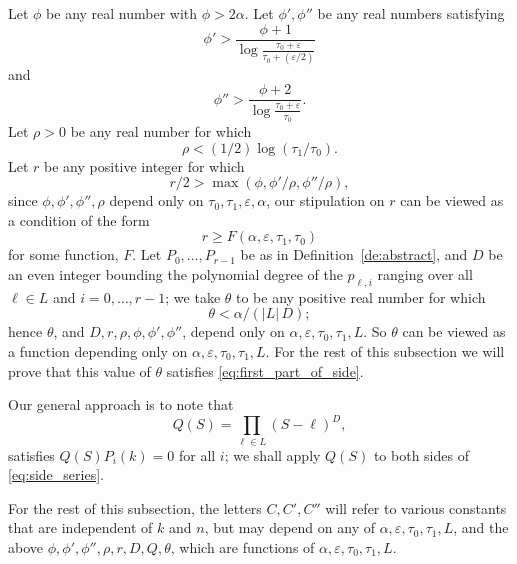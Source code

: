 \documentclass{memo-l}
\theoremstyle{plain}
\theoremstyle{definition}
\numberwithin{section}{chapter}
\numberwithin{equation}{chapter}
\theoremstyle{plain}
\theoremstyle{definition}
\begin{document}
Let \( \phi \) be any real number with \( \phi>2\alpha \).  Let \(
\phi',\phi'' \) be any real numbers satisfying
\begin{equation}\label{eq:givephi1} \phi' >
\frac{\phi+1}{\log\frac{\tau_0+\varepsilon}{\tau_0+(\varepsilon/2)}}
\end{equation} and \begin{equation}\label{eq:givephi2} \phi'' >
\frac{\phi+2}{\log\frac{\tau_0+\varepsilon}{\tau_0}}.  \end{equation} Let
\( \rho>0 \) be any real number for which
\begin{equation}\label{eq:giverho} \rho < (1/2) \log(\tau_1/\tau_0).
\end{equation} Let \( r \) be any positive integer for which
\begin{equation}\label{eq:giver} r/2 > \max(\phi,\phi'/\rho,\phi''/\rho) ,
\end{equation} 
since $\phi,\phi',\phi'',\rho$ depend only on 
$\tau_0,\tau_1,\varepsilon,\alpha$, our stipulation on $r$ can be viewed
as a condition of the form
$$
r\ge F(\alpha,\varepsilon,\tau_1,\tau_0)
$$
for some function, $F$.
Let \( P_0,\ldots,P_{r-1} \) be as in
Definition~\ref{de:abstract}, and \( D \) be an even integer bounding the
polynomial degree of the \( p_{\ell,i} \) ranging over all \( \ell\in L \)
and \( i=0,\ldots,r-1 \); we take \( \theta \) to be any positive real
number for which \begin{equation}\label{eq:givetheta} \theta < \alpha /
(|L|\,D); \end{equation} hence \( \theta \), and \(
D,r,\rho,\phi,\phi',\phi'' \), depend only on \(
\alpha,\varepsilon,\tau_0,\tau_1,L \).  So \( \theta \) can be viewed as a
function depending only on \( \alpha,\varepsilon,\tau_0,\tau_1,L \).  For
the rest of this subsection we will prove that this value of \( \theta \)
satisfies \eqref{eq:first_part_of_side}.  

Our general approach is to note that \[ Q(S) = \prod_{\ell\in L}
(S-\ell)^D, \] satisfies \( Q(S)P_i(k)=0 \) for all \( i \); we shall apply
\( Q(S) \) to both sides of \eqref{eq:side_series}.

For the rest of this subsection, the letters \( C,C',C'' \) will refer to
various constants that are independent of \( k \) and \( n \), but may
depend on any of \( \alpha,\varepsilon,\tau_0,\tau_1,L \), and the above \(
\phi,\phi',\phi'',\rho,r,D,Q,\theta \), which are functions of \(
\alpha,\varepsilon,\tau_0,\tau_1,L \).
\end{document}
